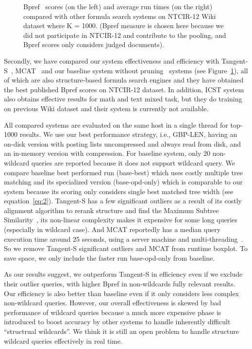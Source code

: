 \documentclass[runningheads]{llncs}
\begin{document}
\begin{figure}[!t]
\begin{center}
\caption{Bpref~\cite{buckley2004retrieval} scores (on the left) and average run times (on the right) compared with other formula search systems on NTCIR-12 Wiki dataset where K = 1000.
(Bpref measure is chosen here because we did not participate in NTCIR-12 and contribute to the pooling, and Bpref scores only considers judged documents).
}
\label{boxplot}
\end{center}

\end{figure}

Secondly, we have compared our system effectiveness and efficiency with Tangent-S~\cite{tangent-combine2017}, MCAT~\cite{mcat_16} and our baseline system without pruning~\cite{a0_2019} systems (see Figure~\ref{boxplot}), all of which are also structure-based formula search engines and they have obtained the best published Bpref scores on NTCIR-12 dataset.
In addition, ICST system~\cite{peking2016} also obtains effective results for math and text mixed task, but they do training on previous Wiki dataset and their system is currently not available.

All compared systems are evaluated on the same host in a single thread for top-1000 results.
%
We use our best performance strategy, i.e., GBP-LEN, having an on-disk version with posting lists uncompressed and always read from disk, and an in-memory version with compression.
%
For baseline system, only 20 non-wildcard queries are reported because it does not support wildcard query.
We compare baseline best performed run (base-best) which uses costly multiple tree matching and its specialized version (base-opd-only) which is comparable to our system because its scoring only considers single best matched tree width (see equation~\ref{eq:2}).
%
Tangent-S has a few significant outliers as a result of its costly alignment algorithm to rerank structure and find the Maximum Subtree Similarity~\cite{tangent-multistage2016}, its non-linear complexity makes it expensive for some long queries (especially in wildcard case).
%
And MCAT reportedly has a median query execution time around 25 seconds, using a server machine and multi-threading~\cite{mcat_16}.
So we remove Tangent-S significant outliers and MCAT from runtime boxplot.
To save space, we only include the faster run base-opd-only from baseline.

As our results suggest, we outperform Tangent-S in efficiency even if we exclude their outlier queries, with higher Bpref in non-wildcards fully relevant results. Our efficiency is also better than baseline even if it only considers less complex non-wildcard queries.
%
However, our overall effectiveness is skewed by bad performance of wildcard queries because a much more expensive phase is introduced to boost accuracy by other systems to handle inherently difficult ``structrual wildcards''.
We think it is still an open problem to handle structure wildcard queries effectively in real time.
\end{document}
